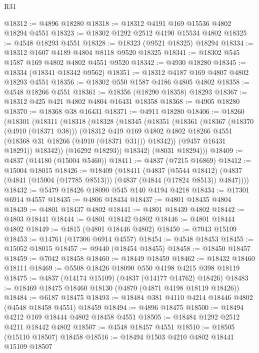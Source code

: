 \begin{lexlean}{R31}
\begin{coremodule}
@18312 := @4896 @18280
@18318 := @18312 @4191 @169 @15536 @4802 @18294 @4551
@18323 := @18302 @1292 @2512 @4190 @15534 @4802
@18325 := @4548 @18293 @4551
@18328 := @18323 (@9521 @18325) @18294
@18334 := @18312 @1607 @4189 @4804 @8118 @9520 @18325
@18341 := @18302 @545 @1587 @169 @4802 @4802 @4551 @9520
@18342 := @4930 @18280
@18345 := @18334 (@18341 @18342 @9562)
@18351 := @18312 @4187 @169 @4807 @4802 @18293 @4551
@18356 := @18302 @550 @1587 @4186 @4805 @4802
@18358 := @4548 @18266 @4551
@18361 := @18356 (@18290 @18358) @18293
@18367 := @18312 @425 @421 @4802 @4804 @16431 @18358
@18368 := @4905 @18280
@18370 := @18368 @38 @16431
@18371 := @4911 @18280
@18406 := @18260
    (@18301
      (@18311
        (@18318
          (@18328
            (@18345
              (@18351
                (@18361
                  (@18367
                    (@18370 (@4910 (@18371 @38)))
                    (@18312
                      @419
                      @169
                      @4802
                      @4802
                      @18266
                      @4551
                      (@18368 @31 @18266 (@4910 (@18371 @31)))
                      @18342))
                  (@9457 @16431 @18291))
                @18342))
            (@16292 @18293))
          @18342)
        (@8031 @18294)))
@18409 := @4837 (@14180 (@15004 @5460))
@18411 := @4837 (@7215 @16869)
@18412 := @15004 @18015
@18426 := @18409
    (@18411
      (@4837
        (@5544 @18412)
        (@4837 (@4841 (@15004 (@17785 @8513))) (@4837 (@4844 (@17824 @8513)) @4847))))
@18432 := @5479 @18426 @18090 @545 @140 @4194 @4218
@18434 := @17301 @6914 @4557
@18435 := @4806 @18434
@18437 := @4801 @18435 @4804
@18439 := @4801 @18437 @4802
@18441 := @4801 @18439 @4802
@18442 := @4803 @18441
@18444 := @4801 @18442 @4802
@18446 := @4801 @18444 @4802
@18449 := @4815 (@4801 @18446 @4802)
@18450 := @7043 @15109
@18453 := @14761 (@17306 @6914 @4557)
@18454 := @4548 @18453
@18455 := @15052 @18015
@18457 := @9440 (@18454 @18455)
@18458 := @18450 @18457
@18459 := @7042 @18458
@18460 := @18449 @18459
@18462 := @18432 @18460 @18111
@18469 := @5508 @18426 @18090 @550 @4198 @4215 @398 @18119
@18475 := @4837 (@14174 @15109) (@4837 (@14177 @14762) @18426)
@18483 := @18469 @18475 @18460 @18130 (@4870 (@4871 @4198 @18119 @18426))
@18484 := @6187 @18475
@18493 := @18484 @381 @4110 @4214 @18446 @4802 (@4548 @18458 @4551) @18459
@18494 := @4896 @18475
@18500 := @18494 @4212 @169 @18444 @4802 @18458 @4551
@18505 := @18484 @1292 @2512 @4211 @18442 @4802
@18507 := @4548 @18457 @4551
@18510 := @18505 (@15110 @18507) @18458
@18516 := @18494 @1503 @4210 @4802 @18441 @15109 @18507

\end{coremodule}
\end{lexlean}
